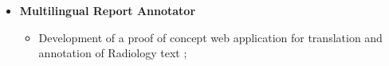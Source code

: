 \begin{itemize}
\item \textbf{Multilingual Report Annotator}
	\begin{itemize}
		\item Development of a proof of concept web application for translation and annotation of Radiology text \citep{Campos2017};
	\end{itemize}
	 
\end{itemize}


